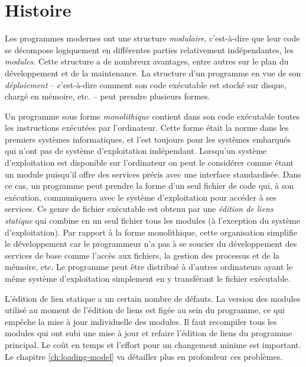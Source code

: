 
\chapter[]{Histoire}%

Les programmes modernes ont une structure \textit{modulaire},
c'est-à-dire que leur code se décompose logiquement en différentes
parties relativement indépendantes, les \textit{modules}.  Cette
structure a de nombreux avantages, entre autres sur le plan du
développement et de la maintenance.  La structure d'un programme en
vue de son \textit{déploiement} -- c'est-à-dire comment son code
exécutable est stocké sur disque, chargé en mémoire, etc. -- peut prendre
plusieurs formes.

Un programme sous forme \textit{monolithique} contient dans son code
exécutable toutes les instructions exécutées par l'ordinateur.  Cette
forme était la norme dans les premiers systèmes informatiques, et
l'est toujours pour les systèmes embarqués qui n'ont pas de système
d'exploitation indépendant.  Lorsqu'un système d'exploitation est
disponible sur l'ordinateur on peut le considérer comme étant un
module puisqu'il offre des services précis avec une interface
standardisée.  Dans ce cas, un programme peut prendre la forme d'un
seul fichier de code qui, à son exécution, communiquera avec le
système d'exploitation pour accéder à ses services.  Ce genre de
fichier exécutable est obtenu par une \textit{édition de liens
  statique} qui combine en un seul fichier tous les modules (à
l'exception du système d'exploitation).  Par rapport à la forme
monolithique, cette organisation simplifie le développement car le
programmeur n'a pas à se soucier du développement des services de base
comme l'accès aux fichiers, la gestion des processus et de la mémoire,
etc.  Le programme peut être distribué à d'autres ordinateurs ayant le
même système d'exploitation simplement en y transférant le fichier
exécutable.

L'édition de lien statique a un certain nombre de défauts. La version des
modules utilisé au moment de l'édition de liens est figée au sein du
programme, ce qui empêche la mise à jour individuelle des modules. Il faut
recompiler tous les modules qui ont subi une mise à jour et refaire l'édition de liens du
programme principal. Le coût en temps et l'effort pour un changement minime
est important.  Le chapitre \ref{ch:loading-model} va détailler plus en profondeur
ces problèmes.

